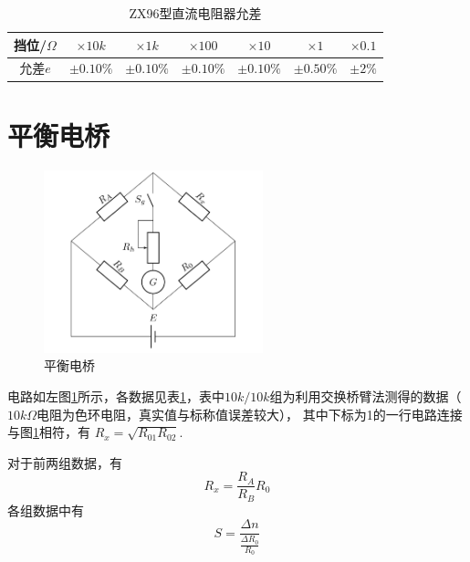 \documentclass[12pt, a4paper]{ctexart}
\begin{document}
\begin{table}[hbtp]
    \centering
    \begin{tabular}{ccccccc}
    \toprule
    挡位/$\Omega$ & $\times 10k$ & $\times 1k$ & $\times 100$ & $\times 10$ & $\times 1$ & $\times 0.1$ \\
    \midrule
    允差$e$   & $\pm 0.10\%$ & $\pm 0.10\%$ & $\pm 0.10\%$ & $\pm 0.10\%$ & $\pm 0.50\%$ & $\pm 2\%$ \\
    \bottomrule
    \end{tabular}
    \caption{ZX96型直流电阻器允差}
    \label{t2}
\end{table}

\clearpage

\section{平衡电桥}

\begin{figure}
    \includegraphics[width=2.5in]{figure/circuit_balenced.png}
    \caption{平衡电桥}
    \label{fig1}
\end{figure}

电路如左图\ref{fig1}所示，各数据见表\ref{t2}，表中$10k/10k$组为利用交换桥臂法测得的数据（$10k\Omega$电阻为色环电阻，真实值与标称值误差较大），
其中下标为1的一行电路连接与图\ref{fig1}相符，有
$R_x = \sqrt{R_{01} R_{02}}$.

对于前两组数据，有
\begin{equation*}
    R_x = \frac{R_A}{R_B} R_0
\end{equation*}
各组数据中有
\begin{equation*}
    S = \frac{\Delta n }{\frac{\Delta R_0}{R_0}}
\end{equation*}
\end{document}
